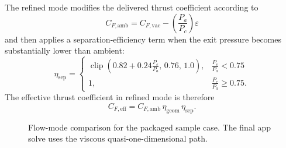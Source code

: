 \documentclass[11pt]{article}
\newcommand{\clip}{\operatorname{clip}}
\begin{document}
The refined mode modifies the delivered thrust coefficient according to
\begin{equation}
C_{F,\mathrm{amb}} = C_{F,\mathrm{vac}} - \left(\frac{P_a}{P_c}\right)\varepsilon
\label{eq:cf-ambient}
\end{equation}
and then applies a separation-efficiency term when the exit pressure becomes substantially lower than ambient:
\begin{equation}
\eta_{\mathrm{sep}}=
\begin{cases}
\clip\!\left(0.82+0.24\frac{P_e}{P_a},\,0.76,\,1.0\right), & \frac{P_e}{P_a}<0.75\\[4pt]
1, & \frac{P_e}{P_a}\ge 0.75.
\end{cases}
\label{eq:separation-efficiency}
\end{equation}
The effective thrust coefficient in refined mode is therefore
\begin{equation}
C_{F,\mathrm{eff}} = C_{F,\mathrm{amb}}\,\eta_{\mathrm{geom}}\,\eta_{\mathrm{sep}}.
\label{eq:cf-refined}
\end{equation}

\begin{figure}[H]
\centering
\begin{minipage}[t]{0.49\textwidth}
\centering
{}
\end{minipage}
\hfill
\begin{minipage}[t]{0.49\textwidth}
\centering
{}
\end{minipage}
\caption{Flow-mode comparison for the packaged sample case. The final app solve uses the viscous quasi-one-dimensional path.}
\end{figure}
\end{document}
